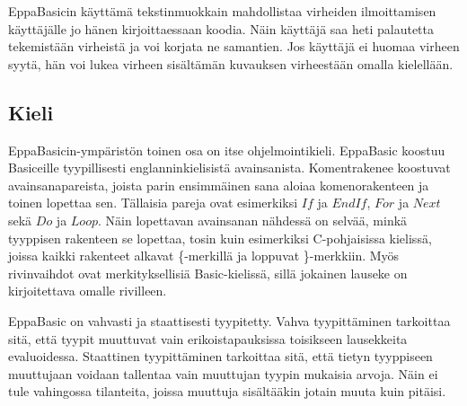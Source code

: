 EppaBasicin käyttämä tekstinmuokkain mahdollistaa
virheiden ilmoittamisen käyttäjälle jo hänen
kirjoittaessaan koodia.
Näin käyttäjä saa heti palautetta tekemistään
virheistä ja voi korjata ne samantien.
Jos käyttäjä ei huomaa virheen syytä,
hän voi lukea virheen sisältämän
kuvauksen virheestään omalla kielellään.

\subsection{Kieli}
EppaBasicin-ympäristön toinen osa on
itse ohjelmointikieli.
EppaBasic koostuu Basiceille tyypillisesti
englanninkielisistä avainsanista.
Komentrakenee koostuvat avainsanapareista,
joista parin ensimmäinen sana aloiaa komenorakenteen
ja toinen lopettaa sen.
Tällaisia pareja ovat esimerkiksi
$If$ ja $End If$,
$For$ ja $Next$
sekä $Do$ ja $Loop$.
Näin lopettavan avainsanan nähdessä on selvää,
minkä tyyppisen rakenteen se lopettaa,
tosin kuin esimerkiksi C-pohjaisissa
kielissä, joissa kaikki rakenteet alkavat
\{-merkillä ja loppuvat \}-merkkiin.
Myös rivinvaihdot ovat merkityksellisiä
Basic-kielissä, sillä jokainen lauseke
on kirjoitettava omalle rivilleen.


EppaBasic on vahvasti ja staattisesti tyypitetty.
Vahva tyypittäminen tarkoittaa sitä,
että tyypit muuttuvat vain erikoistapauksissa toisikseen
lausekkeita evaluoidessa.
Staattinen tyypittäminen tarkoittaa sitä,
että tietyn tyyppiseen muuttujaan voidaan tallentaa
vain muuttujan tyypin mukaisia arvoja.
Näin ei tule vahingossa tilanteita,
joissa muuttuja sisältääkin jotain muuta kuin pitäisi.
